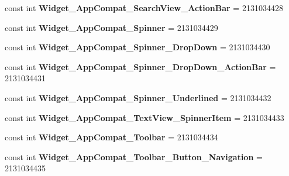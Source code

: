 \begin{DoxyCompactItemize}
\item 
\hypertarget{classClient_1_1Droid_1_1Resource_1_1Style_a8f441be650b8ce37d0f2b0e6abc095ea}{}const int {\bfseries Widget\+\_\+\+App\+Compat\+\_\+\+Search\+View\+\_\+\+Action\+Bar} = 2131034428\label{classClient_1_1Droid_1_1Resource_1_1Style_a8f441be650b8ce37d0f2b0e6abc095ea}

\item 
\hypertarget{classClient_1_1Droid_1_1Resource_1_1Style_acfda85e06ba36106d9bdffda42098176}{}const int {\bfseries Widget\+\_\+\+App\+Compat\+\_\+\+Spinner} = 2131034429\label{classClient_1_1Droid_1_1Resource_1_1Style_acfda85e06ba36106d9bdffda42098176}

\item 
\hypertarget{classClient_1_1Droid_1_1Resource_1_1Style_a54b78911a658d7b143920199a6071e5d}{}const int {\bfseries Widget\+\_\+\+App\+Compat\+\_\+\+Spinner\+\_\+\+Drop\+Down} = 2131034430\label{classClient_1_1Droid_1_1Resource_1_1Style_a54b78911a658d7b143920199a6071e5d}

\item 
\hypertarget{classClient_1_1Droid_1_1Resource_1_1Style_a31c631d71e9131719dce4f2051f4e0a2}{}const int {\bfseries Widget\+\_\+\+App\+Compat\+\_\+\+Spinner\+\_\+\+Drop\+Down\+\_\+\+Action\+Bar} = 2131034431\label{classClient_1_1Droid_1_1Resource_1_1Style_a31c631d71e9131719dce4f2051f4e0a2}

\item 
\hypertarget{classClient_1_1Droid_1_1Resource_1_1Style_a750c8ce42d16ab7a132027334020f23b}{}const int {\bfseries Widget\+\_\+\+App\+Compat\+\_\+\+Spinner\+\_\+\+Underlined} = 2131034432\label{classClient_1_1Droid_1_1Resource_1_1Style_a750c8ce42d16ab7a132027334020f23b}

\item 
\hypertarget{classClient_1_1Droid_1_1Resource_1_1Style_ad3ad6785cbdaced9326fc6149bb1e261}{}const int {\bfseries Widget\+\_\+\+App\+Compat\+\_\+\+Text\+View\+\_\+\+Spinner\+Item} = 2131034433\label{classClient_1_1Droid_1_1Resource_1_1Style_ad3ad6785cbdaced9326fc6149bb1e261}

\item 
\hypertarget{classClient_1_1Droid_1_1Resource_1_1Style_ade7b8829cc35be89e3b7eec6745b051d}{}const int {\bfseries Widget\+\_\+\+App\+Compat\+\_\+\+Toolbar} = 2131034434\label{classClient_1_1Droid_1_1Resource_1_1Style_ade7b8829cc35be89e3b7eec6745b051d}

\item 
\hypertarget{classClient_1_1Droid_1_1Resource_1_1Style_a15cec055a767ad8da87f80090b05a1e4}{}const int {\bfseries Widget\+\_\+\+App\+Compat\+\_\+\+Toolbar\+\_\+\+Button\+\_\+\+Navigation} = 2131034435\label{classClient_1_1Droid_1_1Resource_1_1Style_a15cec055a767ad8da87f80090b05a1e4}


\end{DoxyCompactItemize}
